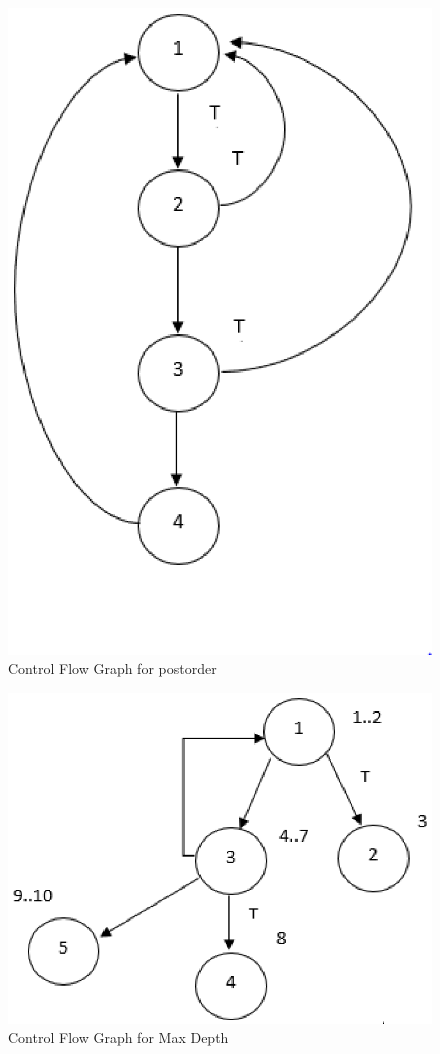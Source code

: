 \documentclass[conference]{IEEEtran}
\begin{document}
 \begin{figure}[h]
\includegraphics[scale=0.4]{CFGPostOrderAlg11}
\caption{Control Flow Graph for postorder}
\label{fig:cfgpostorder}
\end{figure}

\begin{figure}[h]
\includegraphics[scale=0.4]{CFGMaxDepthAlgo12}
\caption{Control Flow Graph for Max Depth}
\label{fig:cfgmaxdepth}
\end{figure}
\end{document}
